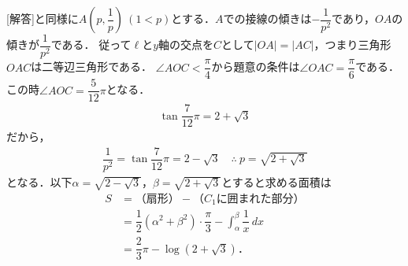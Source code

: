 \documentclass[../../main.tex]{subfiles}
\begin{document}
[解答]と同様に$A\left(p,\dfrac{1}{p}\right) \ (1<p)$とする．$A$での接線の傾きは$-\dfrac{1}{p^2}$であり，$OA$の傾きが$\dfrac{1}{p^2}$である．
従って$\ell$と$y$軸の交点を$C$として$|OA|=|AC|$，つまり三角形$OAC$は二等辺三角形である．
$\angle AOC<\dfrac{\pi}{4}$から題意の条件は$\angle OAC=\dfrac{\pi}{6}$である．
この時$\angle AOC=\dfrac{5}{12}\pi$となる．
\begin{align}
  \tan\dfrac{7}{12}\pi=2+\sqrt{3}
\end{align}
だから，
\begin{align}
  \dfrac{1}{p^2}=\tan\dfrac{7}{12}\pi=2-\sqrt{3}
  \quad\therefore\
  p=\sqrt{2+\sqrt{3}}
\end{align}
となる．以下$\alpha=\sqrt{2-\sqrt{3}}$，$\beta=\sqrt{2+\sqrt{3}}$とすると求める面積は
\begin{align}
  S&=\text{（扇形）}-\text{（$C_1$に囲まれた部分）}\\
  &=\dfrac{1}{2}(\alpha^2+\beta^2)\cdot\dfrac{\pi}{3}-\int_\alpha^\beta\dfrac{1}{x}\,dx\\
  &=\dfrac{2}{3}\pi-\log(2+\sqrt{3})．
\end{align}

\newpage
\end{document}
